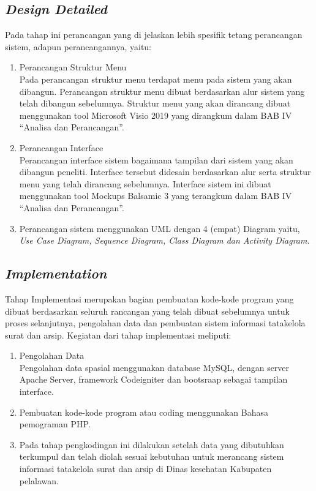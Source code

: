 \subsection{\textit{Design Detailed}}
Pada tahap ini perancangan yang di jelaskan lebih spesifik tetang perancangan sistem, adapun perancangannya, yaitu:
\begin{enumerate}
	\item 	Perancangan Struktur Menu\\
	Pada perancangan struktur menu terdapat  menu pada sistem yang akan dibangun. Perancangan struktur menu dibuat berdasarkan alur sistem yang telah dibangun sebelumnya. Struktur menu yang akan dirancang dibuat menggunakan tool Microsoft Visio 2019 yang dirangkum dalam BAB IV “Analisa dan Perancangan”.
	\item	Perancangan Interface\\
	Perancangan interface sistem bagaimana tampilan dari sistem yang akan dibangun peneliti. Interface tersebut didesain berdasarkan alur serta struktur menu yang telah dirancang sebelumnya. Interface sistem ini dibuat menggunakan tool Mockups Balsamic 3 yang terangkum dalam BAB IV “Analisa dan Perancangan”.
	\item	Perancangan sistem menggunakan UML dengan 4 (empat) Diagram yaitu, \textit{Use Case Diagram, Sequence Diagram, Class Diagram dan Activity Diagram}.
\end{enumerate}

\subsection{\textit{Implementation}}
Tahap Implementasi merupakan bagian pembuatan kode-kode program yang dibuat berdasarkan seluruh rancangan yang telah dibuat sebelumnya untuk proses selanjutnya, pengolahan data dan pembuatan sistem informasi tatakelola surat dan arsip. Kegiatan dari tahap implementasi meliputi:
\begin{enumerate}
	\item 	Pengolahan Data\\
	Pengolahan data spasial menggunakan database MySQL, dengan server Apache Server, framework Codeigniter dan bootsraap sebagai tampilan interface.
	\item 	Pembuatan kode-kode program atau coding menggunakan Bahasa pemograman PHP.
	\item 	Pada tahap pengkodingan ini dilakukan setelah data yang dibutuhkan terkumpul dan telah diolah sesuai kebutuhan untuk merancang sistem informasi tatakelola surat dan arsip di Dinas kesehatan Kabupaten pelalawan.
\end{enumerate}

